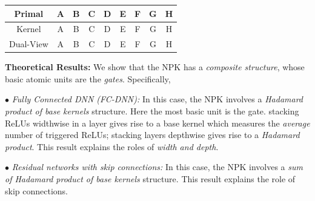 \FloatBarrier
\begin{figure}[h]
\centering
{}
\end{figure}



\begin{table}
\begin{tabular}{ccccccccc}\hline
Primal & A & B & C& D & E& F & G & H\\ \hline
Kernel & A & B & C& D & E& F & G & H\\ \hline
Dual-View& A & B & C& D & E& F & G & H\\ \hline
\end{tabular}
\end{table}



\textbf{Theoretical Results:} We show that the NPK has a \emph{composite structure}, whose basic atomic units are the \emph{gates}. Specifically,

$\bullet$ \emph{Fully Connected DNN (FC-DNN):} In this case, the NPK involves a \emph{ Hadamard product of base kernels} structure. Here the most basic unit is the gate.  stacking ReLUs widthwise in a layer gives rise to a base kernel which measures the \emph{average} number of triggered ReLUs; stacking layers depthwise gives rise to a \emph{Hadamard product}. This result explains the roles of \emph{width and depth}.

$\bullet$ \emph{Residual networks with skip connections:} In this case, the NPK involves a  \emph{ sum of Hadamard product of base kernels} structure. This result explains the role of skip connections.

